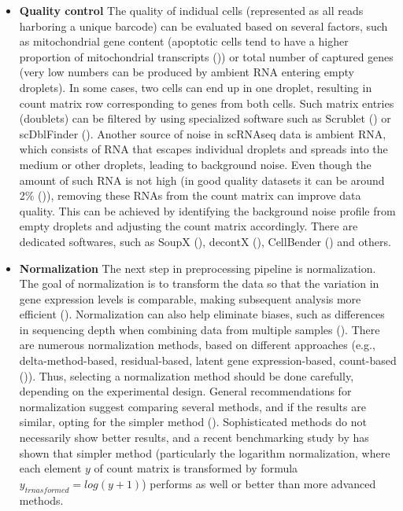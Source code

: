 \begin{itemize}
  \item \textbf{Quality control}
The quality of indidual cells (represented as all reads harboring a unique barcode)
can be evaluated based on several factors, such as mitochondrial gene content
(apoptotic cells tend to have a higher proportion of mitochondrial transcripts (\cite{Heumos2023})) or
total number of captured genes (very low numbers can be produced by ambient RNA entering empty droplets).
In some cases, two cells can end up in one droplet,
resulting in count matrix row corresponding to genes from  both cells.
Such matrix entries (doublets) can be filtered by using specialized software
such as Scrublet (\cite{Wolock2019}) or scDblFinder (\cite{Germain2022}).
Another source of noise in scRNAseq data is ambient RNA,
which consists of RNA that escapes individual droplets and spreads into the medium or other droplets,
leading to background noise.
Even though the amount of such RNA is not high (in good quality datasets it can be around 2\% (\cite{Young2020})),
removing these RNAs from the count matrix can improve data quality.
This can be achieved by identifying the background noise profile from empty droplets and
adjusting the count matrix accordingly.
There are dedicated softwares,
such as SoupX (\cite{Young2020}), decontX (\cite{Yang2020}), CellBender (\cite{Fleming2023}) and others.
  \item \textbf{Normalization}
The next step in preprocessing pipeline is normalization.
The goal of normalization is to transform the data so that the variation in gene expression levels is comparable,
making subsequent analysis more efficient (\cite{Ahlmann2023}).
Normalization can also help eliminate biases,
such as differences in sequencing depth when combining data from multiple samples (\cite{Lingen2024}).
There are numerous normalization methods, based on different approaches
(e.g., delta-method-based, residual-based, latent gene expression-based, count-based (\cite{Ahlmann2023})).
Thus, selecting a normalization method should be done carefully, depending on the experimental design.
General recommendations for normalization suggest comparing several methods,
and if the results are similar, opting for the simpler method (\cite{Lingen2024}).
Sophisticated methods do not necessarily show better results, and a recent benchmarking study by \textcite{Ahlmann2023}
has shown that simpler method (particularly the logarithm normalization,
where each element $y$ of count matrix is transformed by formula $y_{trnasformed} = log(y+1)$)
performs as well or better than more advanced methods.

\end{itemize}
